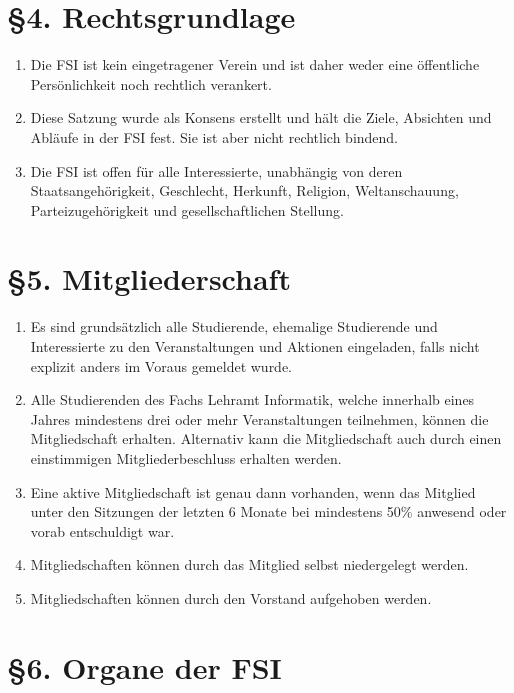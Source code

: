 \documentclass[a4paper,12pt]{article}
\begin{document}
\section*{§4. Rechtsgrundlage}

\begin{enumerate}
	\item
		Die FSI ist kein eingetragener Verein und ist daher weder eine
		öffentliche Persönlichkeit noch rechtlich verankert.
	\item
		Diese Satzung wurde als Konsens erstellt und hält die Ziele,
		Absichten und Abläufe in der FSI fest. Sie ist aber nicht
		rechtlich bindend.
    	\item
		Die FSI ist offen für alle Interessierte, unabhängig von deren
		Staatsangehörigkeit, Geschlecht, Herkunft, Religion,
		Weltanschauung, Parteizugehörigkeit und gesellschaftlichen
		Stellung.
\end{enumerate}

\section*{§5. Mitgliederschaft}

\begin{enumerate}
	\item
		Es sind grundsätzlich alle Studierende, ehemalige Studierende
		und Interessierte zu den Veranstaltungen und Aktionen
		eingeladen, falls nicht explizit anders im Voraus gemeldet
		wurde.
    	\item
		Alle Studierenden des Fachs Lehramt Informatik, welche innerhalb
		eines Jahres mindestens drei oder mehr Veranstaltungen
		teilnehmen, können die Mitgliedschaft erhalten. Alternativ kann
		die Mitgliedschaft auch durch einen einstimmigen
		Mitgliederbeschluss erhalten werden.
	\item
		Eine aktive Mitgliedschaft ist genau dann vorhanden, wenn das
		Mitglied unter den Sitzungen der letzten 6 Monate bei mindestens
		50\% anwesend oder vorab entschuldigt war.
	\item
		Mitgliedschaften können durch das Mitglied selbst niedergelegt
		werden.
	\item 	Mitgliedschaften können durch den Vorstand aufgehoben werden.
\end{enumerate}

\section*{§6. Organe der FSI}
\end{document}
